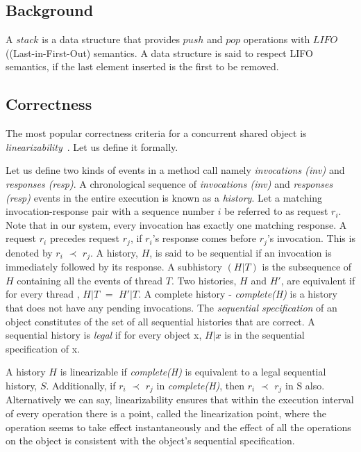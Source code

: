 \documentclass{llncs}
\begin{document}
\begin{appendix}
\section{Background}
\label{sec:back}

A $stack$ is a data structure that provides $push$ and $pop$ operations with $LIFO$((Last-in-First-Out) semantics.  A
data structure is said to respect LIFO semantics, if the last element inserted is the first to be removed.

\subsection{Correctness}
\label{subsec:linearizability}
The most popular correctness criteria for a concurrent shared object is {\em
linearizability}~\cite{linearizability}. Let us define it formally.

Let us define two kinds of events in a
method call namely {\em invocations (inv)} and {\em responses (resp)}. A
chronological sequence of {\em invocations (inv)} and {\em responses (resp)}
events in the entire execution is known as a {\em history}.  Let a matching
invocation-response pair with a sequence number $i$ be referred to as request
$r_i$. Note that in our system, every invocation has exactly one matching
response.  A request $r_i$ precedes request $r_j$, if
$r_i$'s response comes before $r_j$'s invocation.  This is denoted by $r_i$ $\prec$
$r_j$. A history, $H$, is said to be sequential if an invocation is immediately
followed by its response. A subhistory $(H|T)$ is the subsequence of $H$
containing all the events of thread $T$. Two histories, $H$ and $H'$, are
equivalent if for every thread , $H|T$ $=$ $H'|T$. 
A complete history - {\em
complete(H)} is a history that does not have any pending invocations. 
The
{\em sequential specification} of an object constitutes of the set of all sequential
histories that are correct. A sequential history is {\em legal} if for every object
x, $H|x$ is in the sequential specification of x. 


A history $H$ is linearizable if {\em complete(H)} is equivalent to a legal
sequential history, $S$. Additionally, if $r_i$ $\prec$ $r_j$ in
{\em complete(H)}, then $r_i$ $\prec$ $r_j$ in S also. Alternatively we can say,
linearizability ensures that within the execution interval of every operation
there is a point, called the linearization point, where the operation seems to
take effect instantaneously and the effect of all the operations on the object
is consistent with the object's sequential specification. 


\end{appendix}
\end{document}

